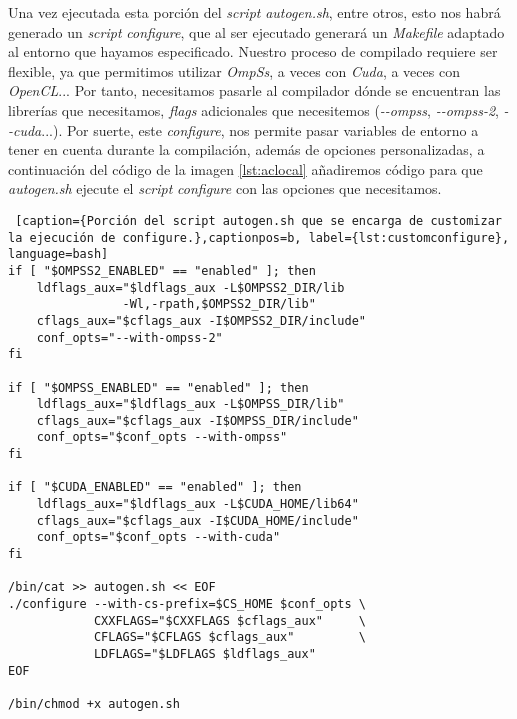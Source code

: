 Una vez ejecutada esta porción del \textit{script} \textit{autogen.sh}, entre otros, esto nos habrá generado un \textit{script} \textit{configure}, que al ser ejecutado generará un \textit{Makefile} adaptado al entorno que hayamos especificado. Nuestro proceso de compilado requiere ser flexible, ya que permitimos utilizar \textit{OmpSs}, a veces con \textit{Cuda}, a veces con \textit{OpenCL}... Por tanto, necesitamos pasarle al compilador dónde se encuentran las librerías que necesitamos, \textit{flags} adicionales que necesitemos (\textit{-{}-ompss}, \textit{-{}-ompss-2}, \textit{-{}-cuda}...). Por suerte, este \textit{configure}, nos permite pasar variables de entorno a tener en cuenta durante la compilación, además de opciones personalizadas, a continuación del código de la imagen \ref{lst:aclocal} añadiremos código para que \textit{autogen.sh} ejecute el \textit{script} \textit{configure} con las opciones que necesitamos.
\par\bigskip

\begin{lstlisting} [caption={Porción del script autogen.sh que se encarga de customizar la ejecución de configure.},captionpos=b, label={lst:customconfigure}, language=bash]                                                                                                                                               
if [ "$OMPSS2_ENABLED" == "enabled" ]; then
    ldflags_aux="$ldflags_aux -L$OMPSS2_DIR/lib
                -Wl,-rpath,$OMPSS2_DIR/lib"
    cflags_aux="$cflags_aux -I$OMPSS2_DIR/include"
    conf_opts="--with-ompss-2"
fi

if [ "$OMPSS_ENABLED" == "enabled" ]; then
    ldflags_aux="$ldflags_aux -L$OMPSS_DIR/lib"
    cflags_aux="$cflags_aux -I$OMPSS_DIR/include"
    conf_opts="$conf_opts --with-ompss"
fi

if [ "$CUDA_ENABLED" == "enabled" ]; then
    ldflags_aux="$ldflags_aux -L$CUDA_HOME/lib64"
    cflags_aux="$cflags_aux -I$CUDA_HOME/include"
    conf_opts="$conf_opts --with-cuda"
fi

/bin/cat >> autogen.sh << EOF
./configure --with-cs-prefix=$CS_HOME $conf_opts \ 
            CXXFLAGS="$CXXFLAGS $cflags_aux"     \  
            CFLAGS="$CFLAGS $cflags_aux"         \
            LDFLAGS="$LDFLAGS $ldflags_aux" 
EOF

/bin/chmod +x autogen.sh
\end{lstlisting}

